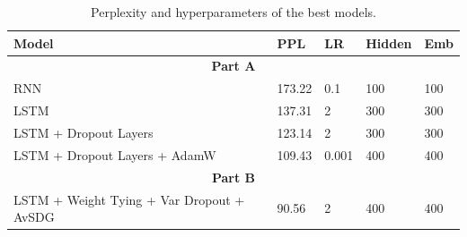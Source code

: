 \documentclass[a4paper]{article}
\begin{document}
\begin{table}[h!]
  \centering
  \begin{tabular}{l p{1 cm} p{1 cm} p{1 cm} p{1 cm}}
      \midrule
      \textbf{Model} & \textbf{PPL} & \textbf{LR} & \textbf{Hidden} & \textbf{Emb} \\
      \midrule
      \multicolumn{5}{c}{\textbf{Part A}} \\
      RNN                     & 173.22 & 0.1    & 100 & 100 \\
      LSTM                    & 137.31 & 2      & 300 & 300 \\
      LSTM + Dropout Layers      & 123.14 & 2      & 300 & 300 \\
      LSTM + Dropout Layers + AdamW & 109.43 & 0.001 & 400 & 400 \\
      \midrule
      \multicolumn{5}{c}{\textbf{Part B}} \\
      \midrule
      LSTM + Weight Tying + Var Dropout + AvSDG & 90.56 & 2 & 400 & 400 \\
      \bottomrule
  \end{tabular}
  \caption{Perplexity and hyperparameters of the best models.}
  \label{tab:results}
\end{table}





\end{document}
